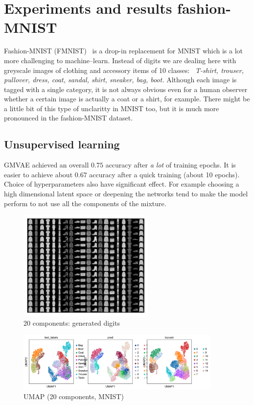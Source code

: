 \documentclass[11pt, a4paper]{report}
\theoremstyle{plain}
\theoremstyle{definition}
\theoremstyle{remark}
\begin{document}
\chapter{Experiments and results fashion-MNIST}
Fashion-MNIST (FMNIST)~\cite{fmnist} is a drop-in replacement for MNIST which
is a lot more challenging to machine--learn. Instead of digits we are dealing
here with greyscale images of clothing and accessory items of 10
classes:~
\emph{
T-shirt, trouser, pullover, dress, coat, sandal, shirt, sneaker, bag, boot.
}
Although each image is tagged with a single category, it is not always obvious
even for a human observer whether a certain image is actually a coat or a shirt,
for example. There might be a little bit of this type of unclaritty in MNIST
too, but it is much more pronounced in the fashion-MNIST dataset.

\section{Unsupervised learning}

GMVAE achieved an overall $0.75$ accuracy after \emph{a lot} of training epochs.
It is easier to achieve about $0.67$ accuracy after a quick training (about 10
epochs).
Choice of hyperparameters also have significant effect. For example choosing 
a high dimensional latent space or deepening the networks tend to make the model
perform to not use all the components of the mixture.

\begin{figure}[h]
\centering
\includegraphics[width=0.6\textwidth]{images/gmmvae_fmnist_us_20c_samples0.png}
\caption{20 components: generated digits}
\label{fig:fmnist_us_20c_samples}
\end{figure}

\begin{figure}[h]
\centering
\includegraphics[width=0.9\textwidth]{images/gmmvae_fmnist_us_20c_umap0.png}
\caption{UMAP (20 components, MNIST)}
\label{fig:fmnist_us_20c_latent}
\end{figure}
\end{document}
